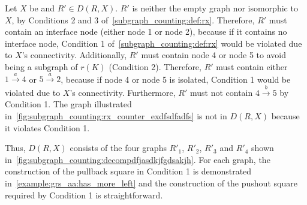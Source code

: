 \begin{example}
\begin{figure}[!htbp]
{\begin{tikzpicture}
        \end{tikzpicture}
        }
        \caption{}
        \label{fig:subgraph_counting:grfksfdfgsdgsd}
    \end{figure}
    Let $X$ be  and $R' \in D(R,X)$. 
    $R'$ is neither the empty graph nor isomorphic to $X$, by Conditions 2 and 3 of~\autoref{subgraph_counting:def:rx}. 
    Therefore, $R'$ must contain an interface node (either node 1 or node 2), because if it contains no interface node, Condition 1 of~\autoref{subgraph_counting:def:rx} would be violated due to $X$'s connectivity.
    Additionally, $R'$ must contain node 4 or node 5 to avoid being a subgraph of $r(K)$ (Condition 2). 
    Therefore, $R'$ must contain either $1 \overset{a}{\to} 4$ or $5 \overset{a}{\to} 2$, because if node 4 or node 5 is isolated, Condition 1 would be violated due to $X$'s connectivity.
    Furthermore, $R'$ must not contain $4 \overset{b}{\to} 5$ by Condition 1.
    The graph illustrated in~\autoref{fig:subgraph_counting:rx_counter_exdfsdfadfs} is not in $D(R,X)$ because it violates Condition 1.
    \begin{figure}[!htbp]
        \centering
        \caption{}
        \label{fig:subgraph_counting:rx_counter_exdfsdfadfs}
    \end{figure}
    Thus, $D(R,X)$ consists of the four graphs $R'_1$, $R'_2$, $R'_3$ and $R'_4$ shown in~\autoref{fig:subgraph_counting:decompdfjasdkjfgdsakjh}.
    For each graph, the construction of the pullback square in Condition 1 is demonstrated in~\autoref{example:grs_aa:has_more_left} and the construction of the pushout square required by Condition 1 is straightforward. 

\end{example}
